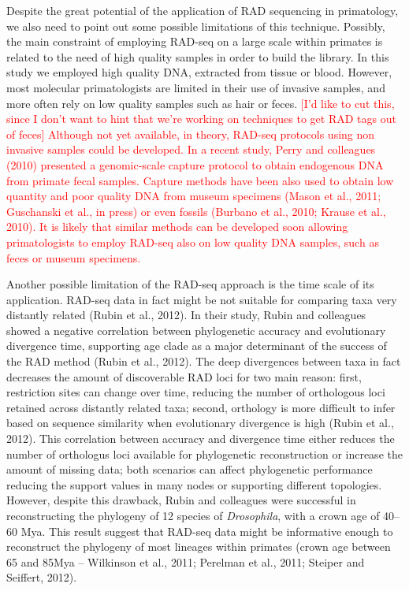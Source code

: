 \documentclass[12pt]{article}
\begin{document}
Despite the great potential of the application of RAD sequencing in primatology, we also need to point out some possible limitations of this technique. Possibly, the main constraint of employing RAD-seq on a large scale within primates is related to the need of high quality samples in order to build the library. In this study we employed high quality DNA, extracted from tissue or blood. However, most molecular primatologists are limited in their use of invasive samples, and more often rely on low quality samples such as hair or feces. \textcolor{red}{[I'd like to cut this, since I don't want to hint that we're working on techniques to get RAD tags out of feces] Although not yet available, in theory, RAD-seq protocols using non invasive samples could be developed. In a recent study, Perry and colleagues (2010) presented a genomic-scale capture protocol to obtain endogenous DNA from primate fecal samples. Capture methods have been also used to obtain low quantity and poor quality DNA from museum specimens (Mason et al., 2011; Guschanski et al., in press) or even fossils (Burbano et al., 2010; Krause et al., 2010). It is likely that similar methods can be developed soon allowing primatologists to employ RAD-seq also on low quality DNA samples, such as feces or museum specimens.}

Another possible limitation of the RAD-seq approach is the time scale of its application. RAD-seq data in fact might be not suitable for comparing taxa very distantly related (Rubin et al., 2012). In their study, Rubin and colleagues showed a negative correlation between phylogenetic accuracy and evolutionary divergence time, supporting age clade as a major determinant of the success of the RAD method (Rubin et al., 2012). The deep divergences between taxa in fact decreases the amount of discoverable RAD loci for two main reason: first, restriction sites can change over time, reducing the number of orthologous loci retained across distantly related taxa; second, orthology is more difficult to infer based on sequence similarity when evolutionary divergence is high (Rubin et al., 2012). This correlation between accuracy and divergence time either reduces the number of orthologus loci available for phylogenetic reconstruction or increase the amount of missing data; both scenarios can affect phylogenetic performance reducing the support values in many nodes or supporting different topologies. However, despite this drawback, Rubin and colleagues were successful in reconstructing the phylogeny of 12 species of \emph{Drosophila}, with a crown age of 40–60 Mya. This result suggest that RAD-seq data might be informative enough to reconstruct the phylogeny of most lineages within primates (crown age between 65 and 85Mya – Wilkinson et al., 2011; Perelman et al., 2011; Steiper and Seiffert, 2012).
\end{document}
